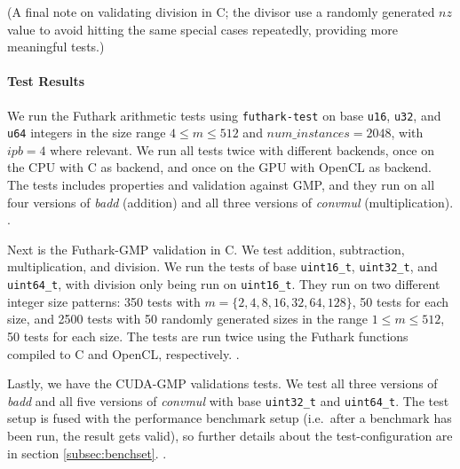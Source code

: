 (A final note on validating division in C; the divisor use a randomly generated
$nz$ value to avoid hitting the same special cases repeatedly, providing more
meaningful tests.)

\paragraph{Test Results}
We run the Futhark arithmetic tests using \texttt{futhark-test} on base
\texttt{u16}, \texttt{u32}, and \texttt{u64} integers in the size range
$4\leq m \leq 512$ and $num\_instances = 2048$, with $ipb = 4$ where relevant. We run
all tests twice with different backends, once on the CPU with C as backend, and
once on the GPU with OpenCL as backend. The tests includes properties and
validation against GMP, and they run on all four versions of \textit{badd}
(addition) and all three versions of \textit{convmul}
(multiplication). .

Next is the Futhark-GMP validation in C. We test addition, subtraction,
multiplication, and division. We run the tests of base \texttt{uint16\_t},
\texttt{uint32\_t}, and \texttt{uint64\_t}, with division only being run on
\texttt{uint16\_t}. They run on two different integer size patterns: 350 tests
with $m=\{2,4,8,16,32,64,128\}$, 50 tests for each size, and 2500 tests with 50
randomly generated sizes in the range $1\leq m \leq 512$, 50 tests for each size. The
tests are run twice using the Futhark functions compiled to C and OpenCL,
respectively. .

Lastly, we have the CUDA-GMP validations tests. We test all three versions of
\textit{badd} and all five versions of \textit{convmul} with base
\texttt{uint32\_t} and \texttt{uint64\_t}. The test setup is fused with the
performance benchmark setup (i.e.\ after a benchmark has been run, the result
gets valid), so further details about the test-configuration are in section
\ref{subsec:benchset}. .

